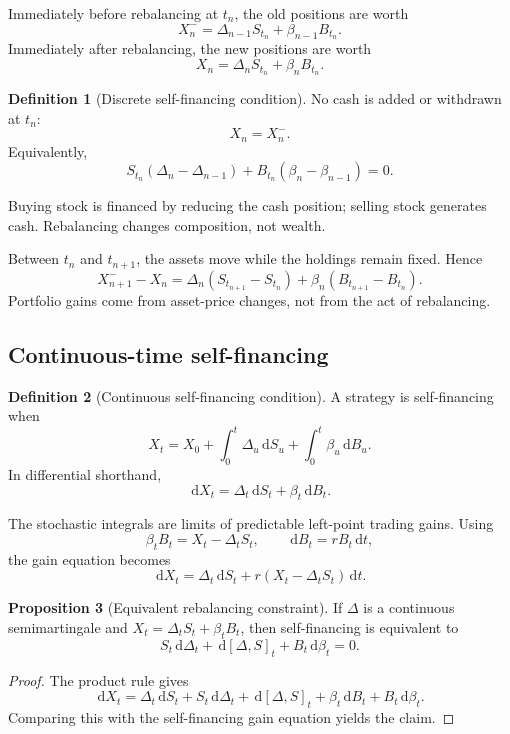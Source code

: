 \documentclass[10pt]{article}
\newcommand{\1}{\mathbf 1}
\newcommand{\dd}{\,\mathrm d}
\theoremstyle{definition}
\newtheorem{definition}{Definition}[section]
\newtheorem{proposition}[definition]{Proposition}
\begin{document}
Immediately before rebalancing at \(t_n\), the old positions are worth
\[
X_n^-=\Delta_{n-1}S_{t_n}+\beta_{n-1}B_{t_n}.
\]
Immediately after rebalancing, the new positions are worth
\[
X_n=\Delta_nS_{t_n}+\beta_nB_{t_n}.
\]

\begin{definition}[Discrete self-financing condition]
No cash is added or withdrawn at \(t_n\):
\[
X_n=X_n^-.
\]
Equivalently,
\[
\boxed{
S_{t_n}(\Delta_n-\Delta_{n-1})
+B_{t_n}(\beta_n-\beta_{n-1})=0.}
\]
\end{definition}

Buying stock is financed by reducing the cash position; selling stock
generates cash. Rebalancing changes composition, not wealth.

Between \(t_n\) and \(t_{n+1}\), the assets move while the holdings remain
fixed. Hence
\[
\boxed{
X_{n+1}^- -X_n
=\Delta_n(S_{t_{n+1}}-S_{t_n})
+\beta_n(B_{t_{n+1}}-B_{t_n}).}
\]
Portfolio gains come from asset-price changes, not from the act of
rebalancing.

\subsection{Continuous-time self-financing}

\begin{definition}[Continuous self-financing condition]
A strategy is self-financing when
\[
\boxed{
X_t=X_0+\int_0^t\Delta_u\dd S_u+\int_0^t\beta_u\dd B_u.}
\]
In differential shorthand,
\[
\boxed{\dd X_t=\Delta_t\dd S_t+\beta_t\dd B_t.}
\]
\end{definition}

The stochastic integrals are limits of predictable left-point trading gains.
Using
\[
\beta_tB_t=X_t-\Delta_tS_t,
\qquad
\dd B_t=rB_t\dd t,
\]
the gain equation becomes
\[
\boxed{
\dd X_t
=\Delta_t\dd S_t+r(X_t-\Delta_tS_t)\dd t.}
\]

\begin{proposition}[Equivalent rebalancing constraint]
If \(\Delta\) is a continuous semimartingale and
\(X_t=\Delta_tS_t+\beta_tB_t\), then self-financing is equivalent to
\[
\boxed{
S_t\dd\Delta_t+\dd[\Delta,S]_t+B_t\dd\beta_t=0.}
\]
\end{proposition}
\begin{proof}
The product rule gives
\[
\dd X_t
=\Delta_t\dd S_t+S_t\dd\Delta_t+\dd[\Delta,S]_t
+\beta_t\dd B_t+B_t\dd\beta_t.
\]
Comparing this with the self-financing gain equation yields the claim.
\end{proof}
\end{document}
